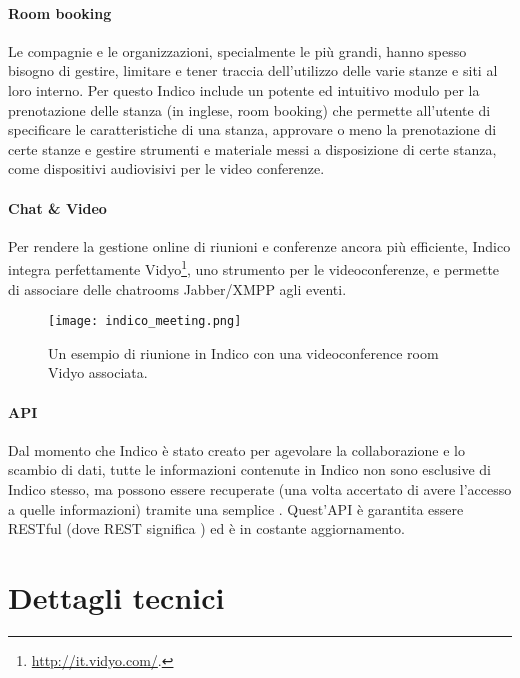 		\paragraph{Room booking}Le compagnie e le organizzazioni, specialmente le più grandi, hanno spesso bisogno di gestire, limitare e tener traccia dell'utilizzo delle varie stanze e siti al loro interno. Per questo Indico include un potente ed intuitivo modulo per la prenotazione delle stanza (in inglese, room booking) che permette all'utente di specificare le caratteristiche di una stanza, approvare o meno la prenotazione di certe stanze e gestire strumenti e materiale messi a disposizione di certe stanza, come dispositivi audiovisivi per le video conferenze.
		
		\paragraph{Chat \& Video}Per rendere la gestione online di riunioni e conferenze ancora più efficiente, Indico integra perfettamente Vidyo\footnote{\url{http://it.vidyo.com/}.}, uno strumento per le videoconferenze, e permette di associare delle chatrooms Jabber/XMPP agli eventi.

		\begin{figure}[h!]
			\begin{center}
				\texttt{[image: indico\_meeting.png]}
			\end{center}
			\caption[Meeting in Indico (esempio)]{Un esempio di riunione in Indico con una videoconference room Vidyo associata.}
			\label{fig:indico_meeting}
		\end{figure}
		
		\paragraph{API}Dal momento che Indico è stato creato per agevolare la collaborazione e lo scambio di dati, tutte le informazioni contenute in Indico non sono esclusive di Indico stesso, ma possono essere recuperate (una volta accertato di avere l'accesso a quelle informazioni) tramite una semplice . Quest'\ac{API} è garantita essere RESTful  (dove \acs{REST} significa ) ed è in costante aggiornamento.
		
	\section{Dettagli tecnici} \label{sec:i;dettagli_tecnici}
	
